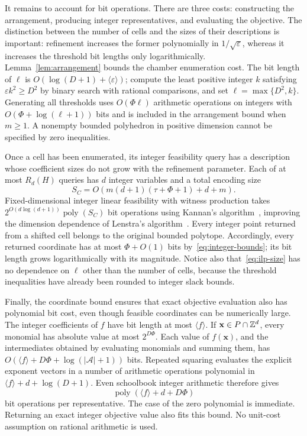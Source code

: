 \documentclass[final,5p,times,twocolumn]{elsarticle}
\theoremstyle{definition}\newtheorem{definition}{Definition}[section]
\theoremstyle{remark}\newtheorem{remark}[theorem]{Remark}
\newcommand{\eps}{\varepsilon}
\newcommand{\poly}{\operatorname{poly}}
\begin{document}
It remains to account for bit operations. There are three costs: constructing the arrangement, producing integer representatives, and evaluating the objective. The distinction between the number of cells and the sizes of their descriptions is important: refinement increases the former polynomially in $1/\sqrt\eps$, whereas it increases the threshold bit lengths only logarithmically.
Lemma~\ref{lem:arrangement} bounds the chamber enumeration cost. The bit length of $\ell$ is $O(\log(D+1)+\langle\eps\rangle)$; compute the least positive integer $k$ satisfying $\eps k^2\ge D^2$ by binary search with rational comparisons, and set $\ell=\max\{D^2,k\}$. Generating all thresholds uses $O(\Phi\ell)$ arithmetic operations on integers with $O(\Phi+\log(\ell+1))$ bits and is included in the arrangement bound when $m\ge1$. A nonempty bounded polyhedron in positive dimension cannot be specified by zero inequalities.

Once a cell has been enumerated, its integer feasibility query has a description whose coefficient sizes do not grow with the refinement parameter.
Each of at most $R_d(H)$ queries has $d$ integer variables and a total encoding size
\begin{equation}\label{eq:ilp-size}
 S_C=O\!\left(m(d+1)(\tau+\Phi+1)+d+m\right).
\end{equation}
Fixed-dimensional integer linear feasibility with witness production takes $2^{O(d\log(d+1))}\poly(S_C)$ bit operations using Kannan's algorithm~\cite{Kannan}, improving the dimension dependence of Lenstra's algorithm~\cite{Lenstra}. Every integer point returned from a shifted cell belongs to the original bounded polytope. Accordingly, every returned coordinate has at most $\Phi+O(1)$ bits by~\eqref{eq:integer-bounds}; its bit length grows logarithmically with its magnitude. Notice also that~\eqref{eq:ilp-size} has no dependence on $\ell$ other than the number of cells, because the threshold inequalities have already been rounded to integer slack bounds.

Finally, the coordinate bound ensures that exact objective evaluation also has polynomial bit cost, even though feasible coordinates can be numerically large.
The integer coefficients of $f$ have bit length at most $\langle f\rangle$. If $\mathbf{x}\in P\cap\mathbb Z^d$, every monomial has absolute value at most $2^{D\Phi}$. Each value of $f(\mathbf{x})$, and the intermediates obtained by evaluating monomials and summing them, has $O(\langle f\rangle+D\Phi+\log(|\mathcal A|+1))$ bits. Repeated squaring evaluates the explicit exponent vectors in a number of arithmetic operations polynomial in $\langle f\rangle+d+\log(D+1)$. Even schoolbook integer arithmetic therefore gives
\begin{equation}\label{eq:eval}
 \poly(\langle f\rangle+d+D\Phi)
\end{equation}
bit operations per representative. The case of the zero polynomial is immediate. Returning an exact integer objective value also fits this bound. No unit-cost assumption on rational arithmetic is used.
\end{document}
